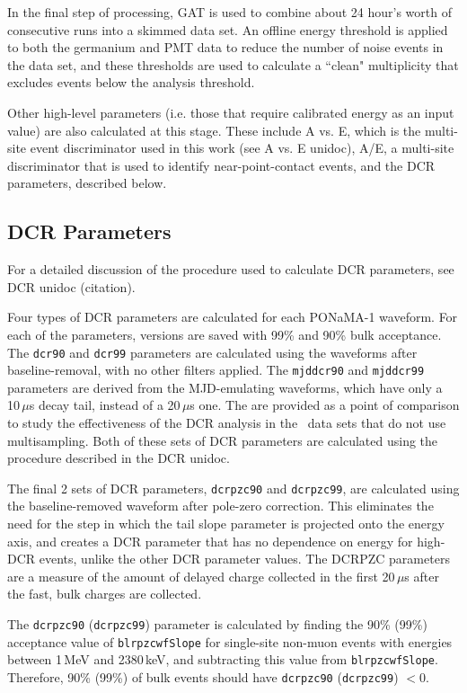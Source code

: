 \documentclass[groupedaddress,rmp,amsmath,amssymb,bibnotes,altaffilletter,twocolumn]{revtex4-1}
\begin{document}
In the final step of processing, GAT is used to combine about 24 hour's worth of consecutive runs into a skimmed data set. An offline energy threshold is applied to both the germanium and PMT data to reduce the number of noise events in the data set, and these thresholds are used to calculate a ``clean" multiplicity that excludes events below the analysis threshold. 

Other high-level parameters (i.e. those that require calibrated energy as an input value) are also calculated at this stage. These include A vs. E, which is the multi-site event discriminator used in this work (see A vs. E unidoc), A/E, a multi-site discriminator that is used to identify near-point-contact events, and the DCR parameters, described below. 

\subsection{DCR Parameters}
For a detailed discussion of the procedure used to calculate DCR parameters, see DCR unidoc (citation). 

Four types of DCR parameters are calculated for each PONaMA-1 waveform. For each of the parameters, versions are saved with 99\% and 90\% bulk acceptance. The {\tt dcr90} and {\tt dcr99} parameters are calculated using the waveforms after baseline-removal, with no other filters applied. The {\tt mjddcr90} and {\tt mjddcr99} parameters are derived from the MJD-emulating waveforms, which have only a 10\,$\mu$s decay tail, instead of a 20\,$\mu$s one. The are provided as a point of comparison to study the effectiveness of the DCR analysis in the \MJ\ data sets that do not use multisampling. Both of these sets of DCR parameters are calculated using the procedure described in the DCR unidoc. 

The final 2 sets of DCR parameters, {\tt dcrpzc90} and {\tt dcrpzc99}, are calculated using the baseline-removed waveform after pole-zero correction. This eliminates the need for the step in which the tail slope parameter is projected onto the energy axis, and creates a DCR parameter that has no dependence on energy for high-DCR events, unlike the other DCR parameter values. The DCRPZC parameters are a measure of the amount of delayed charge collected in the first 20\,$\mu$s after the fast, bulk charges are collected. 

The {\tt dcrpzc90} ({\tt dcrpzc99}) parameter is calculated by finding the 90\% (99\%) acceptance value of {\tt blrpzcwfSlope} for single-site non-muon events with energies between 1\,MeV and 2380\,keV, and subtracting this value from {\tt blrpzcwfSlope}. Therefore, 90\% (99\%) of bulk events should have {\tt dcrpzc90} ({\tt dcrpzc99}) $< 0$.  
\end{document}
